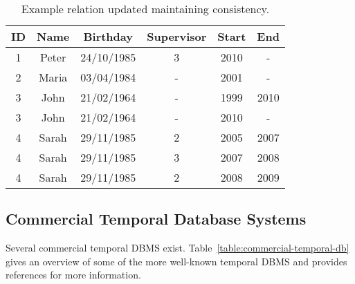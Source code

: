 



\begin{table}
\centering
\caption{Example relation updated maintaining consistency.}
\begin{tabular}{c c c c c c }
\hline
\textbf{ID} & \textbf{Name} & \textbf{Birthday} & \textbf{Supervisor} & \textbf{Start} & \textbf{End} \\ \hline
1 & Peter & 24/10/1985 & 3 &  2010 & - \\
2 & Maria & 03/04/1984 & - & 2001 & - \\
3 & John & 21/02/1964 & - &  1999 & 2010 \\
3 & John & 21/02/1964 & - &  2010 & - \\
4 & Sarah & 29/11/1985 & 2 &  2005 & 2007 \\
4 & Sarah & 29/11/1985 & 3 &  2007 & 2008 \\
4 & Sarah & 29/11/1985 & 2 &  2008 & 2009 \\
\hline 
\end{tabular}
\label{table:example-database-update}



\end{table}





\subsection{\label{Comm-temp}Commercial Temporal Database Systems}
Several commercial temporal DBMS exist. Table~\ref{table:commercial-temporal-db} gives an overview of some of the more well-known temporal DBMS and provides references for more information. 

